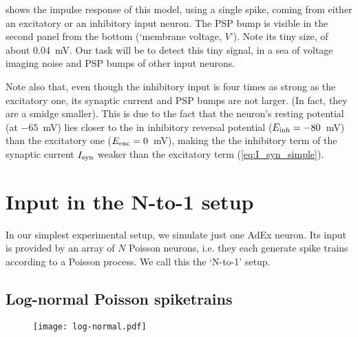  shows the impulse response of this model, using a single spike, coming from either an excitatory or an inhibitory input neuron. The PSP bump is visible in the second panel from the bottom (`membrane voltage, $V$'). Note its tiny size, of about 0.04~mV. Our task will be to detect this tiny signal, in a sea of voltage imaging noise and PSP bumps of other input neurons.

Note also that, even though the inhibitory input is four times as strong as the excitatory one, its synaptic current and PSP bumps are not larger. (In fact, they are a smidge smaller). This is due to the fact that the neuron's resting potential (at $-65$~mV) lies closer to the in inhibitory reversal potential ($E_{\text{inh}} = -80$~mV) than the excitatory one ($E_{\text{exc}} = 0$~mV), making the the inhibitory term of the synaptic current $I_{\text{syn}}$ weaker than the excitatory term  (\cref{eq:I_syn_simple}).



\FloatBarrier
\section{Input in the N-to-1 setup}
\label{sec:lognormal-poisson-input}

In our simplest experimental setup, we simulate just one AdEx neuron.
Its input is provided by an array of $N$ Poisson neurons, i.e. they each generate spike trains according to a Poisson process. We call this the `N-to-1' setup.

\subsection{Log-normal Poisson spiketrains}


\begin{figure}
    \hspace*{-4em}
    \texttt{[image: log-normal.pdf]}
    \label{fig:log-normal}
\end{figure}

